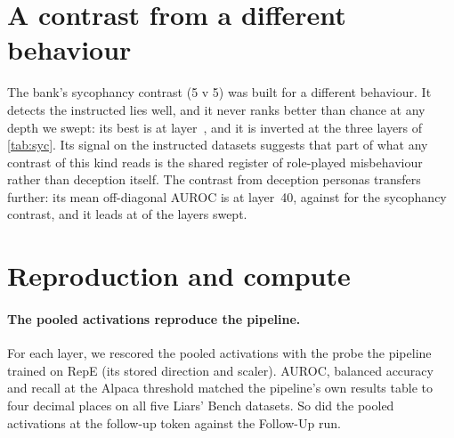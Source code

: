 \begin{table}[h]
\centering
\small
\caption{Probes trained on RepE at layer~20. Mean AUROC over the five Liars' Bench datasets.}
\label{tab:kthree}

\end{table}

\section{A contrast from a different behaviour}
\label{app:sycophancy}

The bank's sycophancy contrast (5 v 5) was built for a different behaviour. It detects the
instructed lies well, and it never ranks \hpkr{} better than chance at any depth we swept: its best
is  at layer~, and it is inverted at the three
layers of \cref{tab:syc}. Its signal on the
instructed datasets suggests that part of what any contrast of this kind reads is the shared
register of role-played misbehaviour rather than deception itself. The contrast from deception
personas transfers further: its mean off-diagonal AUROC is  at layer~40, against
 for the sycophancy contrast, and it leads at  of the
 layers swept.

\begin{table}[h]
\centering
\small
\caption{Zero-shot AUROC of the sycophancy contrast (5 v 5), and its mean off-diagonal AUROC as a
probe feature.}
\label{tab:syc}

\end{table}

\section{Reproduction and compute}
\label{app:repro}

\paragraph{The pooled activations reproduce the pipeline.} For each layer, we rescored the pooled
activations with the probe the pipeline trained on RepE (its stored direction and scaler). AUROC,
balanced accuracy and recall at the Alpaca threshold matched the pipeline's own results table to
four decimal places on all five Liars' Bench datasets. So did the pooled activations at the
follow-up token against the Follow-Up run.

